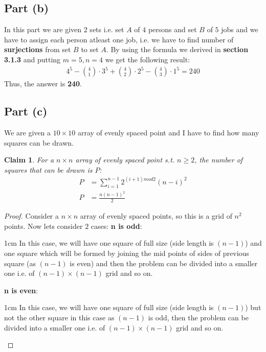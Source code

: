 \documentclass{article}
\let\bold\textbf
\newtheorem{claim}{Claim}[section]
\newenvironment{myenv}{\begin{adjustwidth}{1cm}{}}{\end{adjustwidth}}
\begin{document}
{  \subsection{Part (b)}{
    In this part we are given $2$ sets i.e. set $A$ of $4$ persons and set $B$ of $5$ jobs and we have to assign each person atleast one job, i.e. we have to find number of \bold{surjections} from set $B$ to set $A$. \newline
    By using the formula we derived in \bold{section 3.1.3} and putting $m=5,n=4$ we get the following result:
    \begin{align*}
      4^5 - \binom{4}{1} \cdot 3^5 + \binom{4}{2} \cdot 2^5 - \binom{4}{3} \cdot 1^5 = 240
    \end{align*}
    Thus, the answer is \bold{240}.
  }
  \subsection{Part (c)}{
    We are given a $10 \times 10$ array of evenly spaced point and I have to find how many squares can be drawn. \newline
    \begin{claim}
      For a $n \times n$ array of evenly spaced point s.t. $n \geq 2$, the number of squares that can be drawn is $P$:
      \begin{align}
        P&=\sum_{i=1}^{n-1} 2^{(i+1)mod2}(n-i)^2 \label{eq:3} \\
        P&=\frac{n(n-1)^2}{2}
      \end{align}
    \end{claim}
    \begin{proof}
      Consider a $n \times n$ array of evenly spaced points, so this is a grid of $n^2$ points. Now lets consider $2$ cases: \newline
      \bold{n is odd}:
      \begin{myenv}
        In this case, we will have one square of full size (side length is $(n-1)$) and one square which will be formed by joining the mid points of sides of previous square (as $(n-1)$ is even) and then the problem can be divided into a smaller one i.e. of $(n-1) \times (n-1)$ grid and so on.
      \end{myenv}
      \bold{n is even}:
      \begin{myenv}
        In this case, we will have one square of full size (side length is $(n-1)$) but not the other square in this case as $(n-1)$ is odd, then the problem can be divided into a smaller one i.e. of $(n-1) \times (n-1)$ grid and so on.

\end{myenv}
\end{proof}}}
\end{document}
